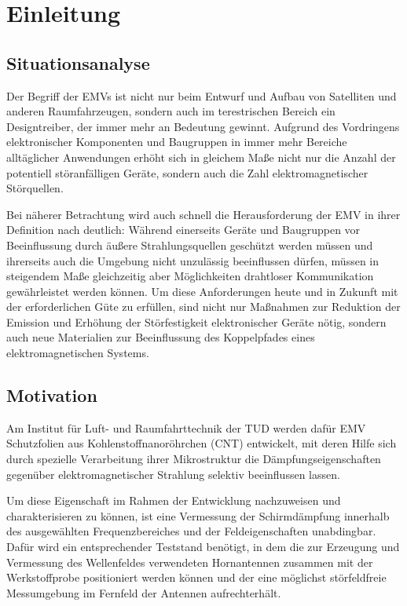 

\chapter{Einleitung}\label{cha:1}

\section{Situationsanalyse}\label{sec_1:Situationsanalyse}
Der Begriff der \acp{EMV} ist nicht nur beim Entwurf und Aufbau von Satelliten und anderen Raumfahrzeugen, sondern auch im terestrischen Bereich ein Designtreiber, der immer mehr an Bedeutung gewinnt. Aufgrund des Vordringens elektronischer Komponenten und Baugruppen in immer mehr Bereiche alltäglicher Anwendungen erhöht sich in gleichem Maße nicht nur die Anzahl der potentiell störanfälligen Geräte, sondern auch die Zahl elektromagnetischer Störquellen. \par
\vspace{\linespace}
Bei näherer Betrachtung wird auch schnell die Herausforderung der \ac{EMV} in ihrer Definition nach \cite{VDE_0870} deutlich: Während einerseits Geräte und Baugruppen vor Beeinflussung durch äußere Strahlungsquellen geschützt werden müssen und ihrerseits auch die Umgebung nicht unzulässig beeinflussen dürfen, müssen in steigendem Maße gleichzeitig aber Möglichkeiten drahtloser Kommunikation gewährleistet werden können. Um diese Anforderungen heute und in Zukunft mit der erforderlichen Güte zu erfüllen, sind nicht nur Maßnahmen zur Reduktion der Emission und Erhöhung der Störfestigkeit elektronischer Geräte nötig, sondern auch neue Materialien zur Beeinflussung des Koppelpfades eines elektromagnetischen Systems.

\section{Motivation}\label{sec_1:Motivation}
Am Institut für Luft- und Raumfahrttechnik der \ac{TUD} werden dafür \ac{EMV} Schutzfolien aus Kohlenstoffnanoröhrchen (CNT)  entwickelt, mit deren Hilfe sich durch spezielle Verarbeitung ihrer Mikrostruktur die Dämpfungseigenschaften gegenüber elektromagnetischer Strahlung selektiv beeinflussen lassen. \par
\vspace{\linespace}
Um diese Eigenschaft im Rahmen der Entwicklung nachzuweisen und charakterisieren zu können, ist eine Vermessung der Schirmdämpfung innerhalb des ausgewählten Frequenzbereiches und der Feldeigenschaften unabdingbar. Dafür wird ein entsprechender Teststand benötigt, in dem die zur Erzeugung und Vermessung des Wellenfeldes verwendeten Hornantennen zusammen mit der Werkstoffprobe positioniert werden können und der eine möglichst störfeldfreie Messumgebung im Fernfeld der Antennen aufrechterhält.

